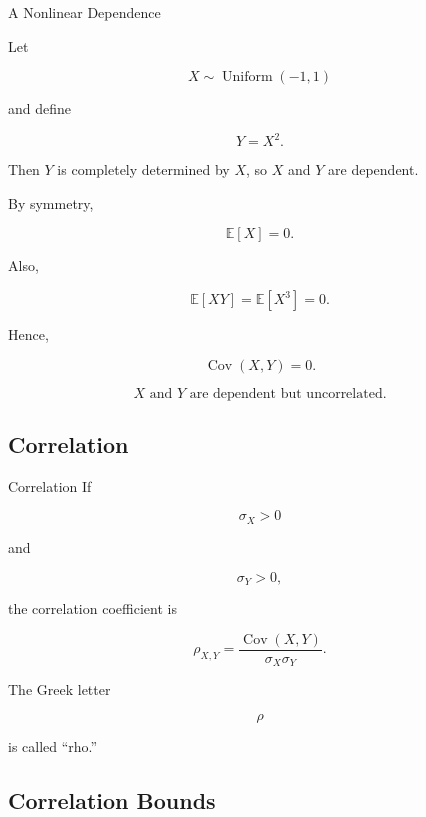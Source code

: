 \begin{workedexamplebox}{A Nonlinear Dependence}

Let

\[
X\sim\operatorname{Uniform}(-1,1)
\]

and define

\[
Y=X^2.
\]

Then \(Y\) is completely determined by \(X\), so \(X\) and \(Y\) are
dependent.

By symmetry,

\[
\mathbb{E}[X]=0.
\]

Also,

\[
\mathbb{E}[XY]
=
\mathbb{E}[X^3]
=
0.
\]

Hence,

\[
\operatorname{Cov}(X,Y)
=
0.
\]

\begin{answerbox}
\[
\boxed{
X\text{ and }Y\text{ are dependent but uncorrelated}.
}
\]
\end{answerbox}

\end{workedexamplebox}

\subsection{Correlation}
\label{subsec:correlation}

\begin{definitionbox}{Correlation}
If

\[
\sigma_X>0
\]

and

\[
\sigma_Y>0,
\]

the correlation coefficient is

\[
\boxed{
\rho_{X,Y}
=
\frac{
\operatorname{Cov}(X,Y)
}{
\sigma_X\sigma_Y
}.
}
\]
\end{definitionbox}

The Greek letter

\[
\rho
\]

is called ``rho.''

\subsection{Correlation Bounds}
\label{subsec:correlation-bounds-full}

